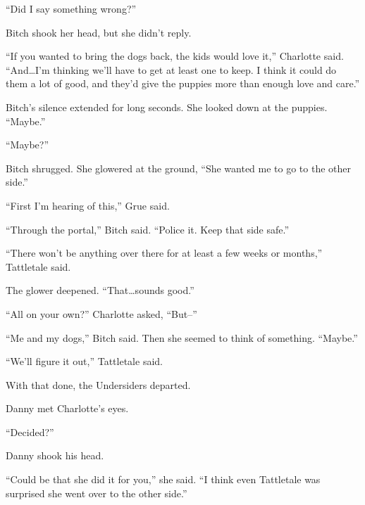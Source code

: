 ``Did I say something wrong?''



Bitch shook her head, but she didn't reply.



``If you wanted to bring the dogs back, the kids would love it,'' Charlotte said.  ``And\ldots I'm thinking we'll have to get at least one to keep.  I think it could do them a lot of good, and they'd give the puppies more than enough love and care.''



Bitch's silence extended for long seconds.  She looked down at the puppies.  ``Maybe.''



``Maybe?''



Bitch shrugged.  She glowered at the ground, ``She wanted me to go to the other side.''



``First I'm hearing of this,'' Grue said.



``Through the portal,'' Bitch said. ``Police it.  Keep that side safe.''



``There won't be anything over there for at least a few weeks or months,'' Tattletale said.



The glower deepened.  ``That\ldots sounds good.''



``All on your own?'' Charlotte asked, ``But--''



``Me and my dogs,'' Bitch said.  Then she seemed to think of something.  ``Maybe.''



``We'll figure it out,'' Tattletale said.



With that done, the Undersiders departed.



Danny met Charlotte's eyes.



``Decided?''



Danny shook his head.



``Could be that she did it for you,'' she said.  ``I think even Tattletale was surprised she went over to the other side.''



